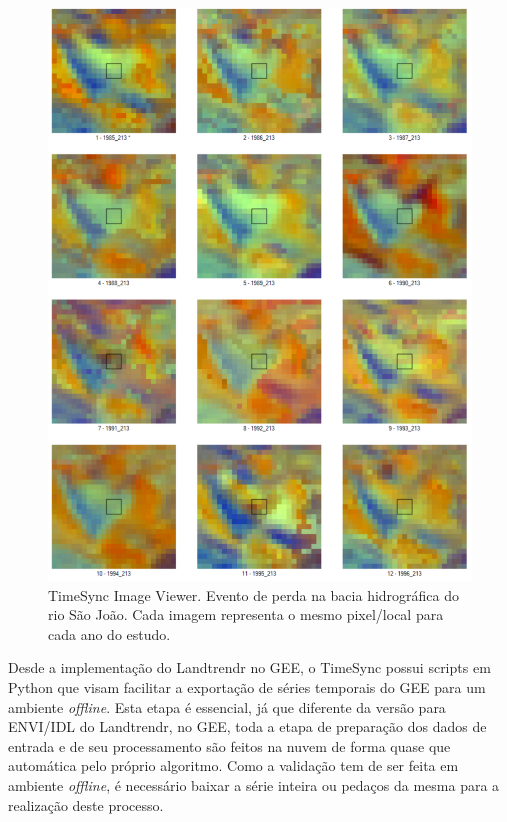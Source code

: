 \begin{figure}[H]
    \centering
    \includegraphics[scale=.5]{images/loss_22_bhrsj_imgs.pdf}
    \caption{TimeSync Image Viewer. Evento de perda na bacia hidrográfica do rio São João. Cada imagem representa o mesmo pixel/local para cada ano do estudo.}
    \label{fig:loss_22_bhrsj_imgs}
\end{figure}

Desde a implementação do Landtrendr no GEE, o TimeSync possui scripts em Python que visam facilitar a exportação de séries temporais do GEE para um ambiente \textit{offline}. Esta etapa é essencial, já que diferente da versão para ENVI/IDL do Landtrendr, no GEE, toda a etapa de preparação dos dados de entrada e de seu processamento são feitos na nuvem de forma quase que automática pelo próprio algoritmo. Como a validação tem de ser feita em ambiente \textit{offline}, é necessário baixar a série inteira ou pedaços da mesma para a realização deste processo. 

